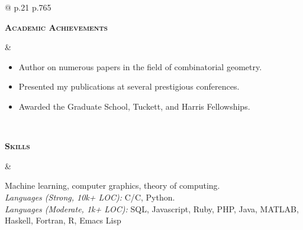 \documentclass[11pt]{article}
\def\cpp{{C\nolinebreak[4]\hspace{-.05em}\raisebox{.4ex}{\tiny\bf ++}}}
\newcommand{\titlecell}[1]{%
    \begin{minipage}[t]{\linewidth}
        \raggedleft \textbf{#1}
    \end{minipage}}
\newcommand{\contentcell}[1]{%
    \begin{minipage}[t]{\linewidth}
        #1
    \end{minipage}}
\newcommand{\tablerowskip}{\vspace{4.9mm} \\}
\begin{document}
\begin{tabular}{@{} p{.21\textwidth} p{.765\textwidth}}
    \titlecell{\textsc{Academic Achievements}} &
    \contentcell{
        \begin{itemize}[itemsep=0pt,topsep=0pt,leftmargin=*] \itemsep -2pt
            \item Author on numerous papers in the field of combinatorial geometry.
            \item Presented my publications at several prestigious conferences.
            \item Awarded the Graduate School, Tuckett, and Harris Fellowships.
        \end{itemize}
    }
    \tablerowskip

    \titlecell{\textsc{Skills}} &
    \contentcell{
        Machine learning, computer graphics, theory of computing. \\
        {\sl Languages (Strong, 10k+ LOC):} C/\cpp, Python. \\
        {\sl Languages (Moderate, 1k+ LOC):} SQL, Javascript, Ruby, PHP, Java, MATLAB, Haskell, Fortran, R, Emacs Lisp
    }
\end{tabular}

\end{document}
